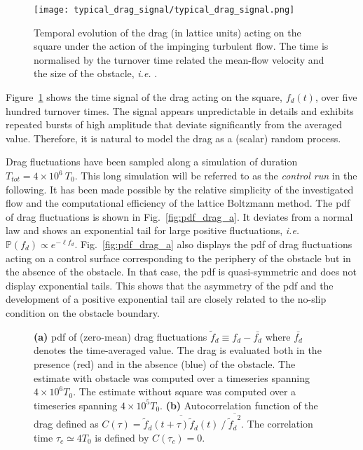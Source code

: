 \begin{figure}
	\centering
	\texttt{[image: typical\_drag\_signal/typical\_drag\_signal.png]}
	\caption{Temporal evolution of the drag (in lattice units) acting on the square under the action of the impinging turbulent flow. The time is normalised by the turnover time related the mean-flow velocity and the size of the obstacle, \emph{i.e.} .}
	\label{fig:typical_drag_signal}
\end{figure}



%
Figure~\ref{fig:typical_drag_signal} shows the time signal of the drag acting on the square, $f_d(t)$, over five hundred turnover times.
The signal appears unpredictable in details and exhibits repeated bursts of high amplitude that deviate significantly from the averaged value.
Therefore, it is natural to model the drag as a (scalar) random process.

Drag fluctuations have been sampled along a simulation of duration $T_{tot} = 4\times 10^6~T_0$.
This long simulation will be referred to as the \textit{control run} in the following.
It has been made possible by the relative simplicity of the investigated flow and the computational efficiency of the lattice Boltzmann method.
The \ac{pdf} of drag fluctuations is shown in Fig.~\ref{fig:pdf_drag_a}.
It deviates from a normal law and shows an exponential tail for large positive fluctuations, \textit{i.e.} ${\mathbb{P}}(f_d) \propto e^{-\ell f_d}$.
%
Fig.~\ref{fig:pdf_drag_a} also displays the \ac{pdf} of drag fluctuations acting on a control surface corresponding to the periphery of the obstacle but in the absence of the obstacle.
%
In that case, the \ac{pdf} is quasi-symmetric and does not display exponential tails. This shows that the asymmetry of the \ac{pdf} and the development of a positive exponential tail are closely related to the no-slip condition on the obstacle boundary.
\begin{figure}
	\centering
	\caption{\textbf{(a)} \ac{pdf} of (zero-mean) drag fluctuations $\tilde f_d \equiv f_d - \bar{f_d}$ where $\bar{f_d}$ denotes the time-averaged value. The drag is evaluated both in the presence (red) and in the absence (blue) of the obstacle. The estimate with obstacle was computed over a timeseries spanning $4\times 10^6T_0$. The estimate without square was computed over a timeseries spanning $4\times 10^5 T_0$.
          \textbf{(b)} Autocorrelation function of the drag defined as $C(\tau) = \overline{ \tilde f_d(t+\tau)\tilde f_d(t)} ~/~ \overline{{\tilde f_d}^2}$. The correlation time $\tau_c\simeq 4 T_0$ is defined by $C(\tau_c)=0$.}
	\label{fig:pdf_drag}
\end{figure}

